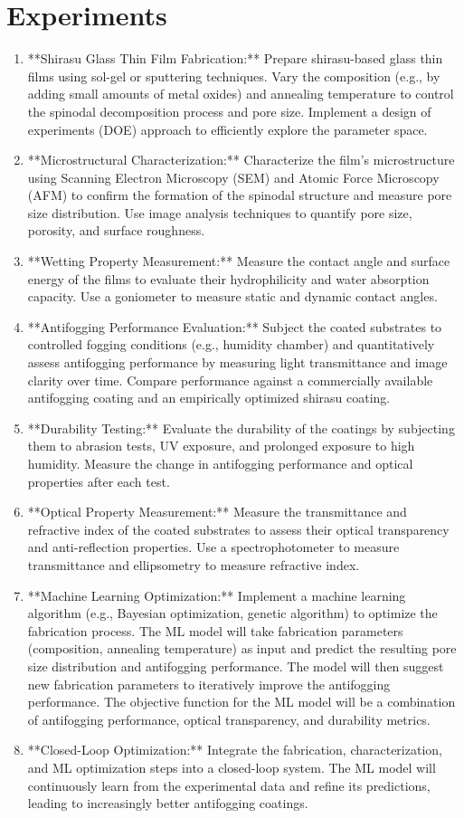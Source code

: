 \documentclass{article}
\begin{document}
\section{Experiments}
\begin{enumerate}
\item **Shirasu Glass Thin Film Fabrication:** Prepare shirasu-based glass thin films using sol-gel or sputtering techniques. Vary the composition (e.g., by adding small amounts of metal oxides) and annealing temperature to control the spinodal decomposition process and pore size. Implement a design of experiments (DOE) approach to efficiently explore the parameter space.
\item **Microstructural Characterization:** Characterize the film's microstructure using Scanning Electron Microscopy (SEM) and Atomic Force Microscopy (AFM) to confirm the formation of the spinodal structure and measure pore size distribution. Use image analysis techniques to quantify pore size, porosity, and surface roughness.
\item **Wetting Property Measurement:** Measure the contact angle and surface energy of the films to evaluate their hydrophilicity and water absorption capacity. Use a goniometer to measure static and dynamic contact angles.
\item **Antifogging Performance Evaluation:** Subject the coated substrates to controlled fogging conditions (e.g., humidity chamber) and quantitatively assess antifogging performance by measuring light transmittance and image clarity over time. Compare performance against a commercially available antifogging coating and an empirically optimized shirasu coating.
\item **Durability Testing:** Evaluate the durability of the coatings by subjecting them to abrasion tests, UV exposure, and prolonged exposure to high humidity. Measure the change in antifogging performance and optical properties after each test.
\item **Optical Property Measurement:** Measure the transmittance and refractive index of the coated substrates to assess their optical transparency and anti-reflection properties. Use a spectrophotometer to measure transmittance and ellipsometry to measure refractive index.
\item **Machine Learning Optimization:** Implement a machine learning algorithm (e.g., Bayesian optimization, genetic algorithm) to optimize the fabrication process. The ML model will take fabrication parameters (composition, annealing temperature) as input and predict the resulting pore size distribution and antifogging performance. The model will then suggest new fabrication parameters to iteratively improve the antifogging performance. The objective function for the ML model will be a combination of antifogging performance, optical transparency, and durability metrics.
\item **Closed-Loop Optimization:** Integrate the fabrication, characterization, and ML optimization steps into a closed-loop system. The ML model will continuously learn from the experimental data and refine its predictions, leading to increasingly better antifogging coatings.
\end{enumerate}
\end{document}

